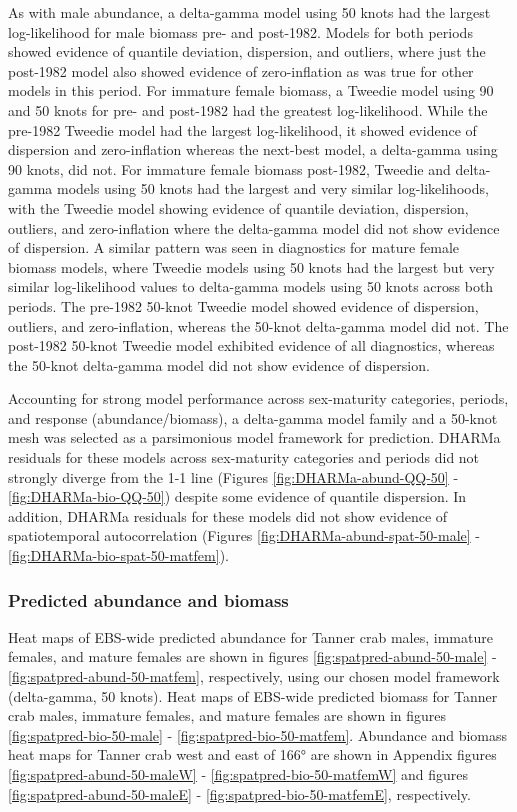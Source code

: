 \documentclass[
]{article}
\begin{document}
As with male abundance, a delta-gamma model using 50 knots had the largest log-likelihood for male biomass pre- and post-1982. Models for both periods showed evidence of quantile deviation, dispersion, and outliers, where just the post-1982 model also showed evidence of zero-inflation as was true for other models in this period. For immature female biomass, a Tweedie model using 90 and 50 knots for pre- and post-1982 had the greatest log-likelihood. While the pre-1982 Tweedie model had the largest log-likelihood, it showed evidence of dispersion and zero-inflation whereas the next-best model, a delta-gamma using 90 knots, did not. For immature female biomass post-1982, Tweedie and delta-gamma models using 50 knots had the largest and very similar log-likelihoods, with the Tweedie model showing evidence of quantile deviation, dispersion, outliers, and zero-inflation where the delta-gamma model did not show evidence of dispersion. A similar pattern was seen in diagnostics for mature female biomass models, where Tweedie models using 50 knots had the largest but very similar log-likelihood values to delta-gamma models using 50 knots across both periods. The pre-1982 50-knot Tweedie model showed evidence of dispersion, outliers, and zero-inflation, whereas the 50-knot delta-gamma model did not. The post-1982 50-knot Tweedie model exhibited evidence of all diagnostics, whereas the 50-knot delta-gamma model did not show evidence of dispersion.

Accounting for strong model performance across sex-maturity categories, periods, and response (abundance/biomass), a delta-gamma model family and a 50-knot mesh was selected as a parsimonious model framework for prediction. DHARMa residuals for these models across sex-maturity categories and periods did not strongly diverge from the 1-1 line (Figures \ref{fig:DHARMa-abund-QQ-50} - \ref{fig:DHARMa-bio-QQ-50}) despite some evidence of quantile dispersion. In addition, DHARMa residuals for these models did not show evidence of spatiotemporal autocorrelation (Figures \ref{fig:DHARMa-abund-spat-50-male} - \ref{fig:DHARMa-bio-spat-50-matfem}).

\subsubsection*{Predicted abundance and biomass}\label{predicted-abundance-and-biomass}

Heat maps of EBS-wide predicted abundance for Tanner crab males, immature females, and mature females are shown in figures \ref{fig:spatpred-abund-50-male} - \ref{fig:spatpred-abund-50-matfem}, respectively, using our chosen model framework (delta-gamma, 50 knots). Heat maps of EBS-wide predicted biomass for Tanner crab males, immature females, and mature females are shown in figures \ref{fig:spatpred-bio-50-male} - \ref{fig:spatpred-bio-50-matfem}. Abundance and biomass heat maps for Tanner crab west and east of 166° are shown in Appendix figures \ref{fig:spatpred-abund-50-maleW} - \ref{fig:spatpred-bio-50-matfemW} and figures \ref{fig:spatpred-abund-50-maleE} - \ref{fig:spatpred-bio-50-matfemE}, respectively.
\end{document}
